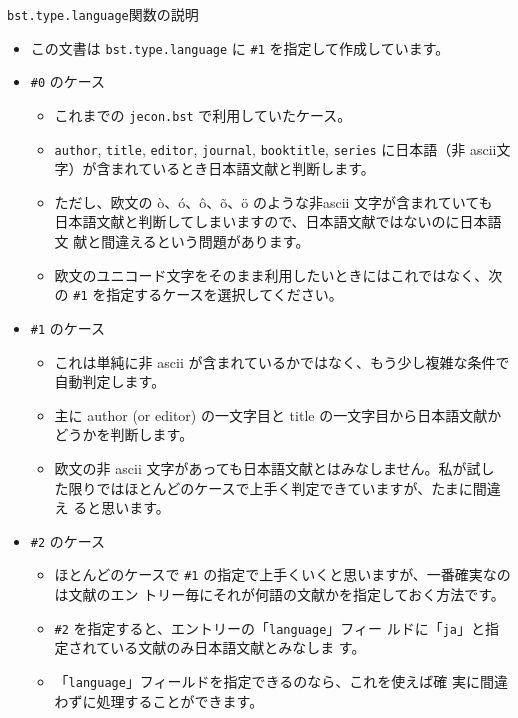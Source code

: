\documentclass[10pt]{bxjsarticle}
\begin{document}
\texttt{bst.type.language}関数の説明
\begin{itemize}
 \item この文書は \texttt{bst.type.language} に \texttt{\#1} を指定して作成しています。
 \item \texttt{\#0} のケース
       \begin{itemize}
	\item これまでの \texttt{jecon.bst} で利用していたケース。
	\item \texttt{author}, \texttt{title}, \texttt{editor},
	      \texttt{journal}, \texttt{booktitle}, \texttt{series} に日本語（非
	      ascii文字）が含まれているとき日本語文献と判断します。
	\item ただし、欧文の ò、ó、ô、õ、ö のような非ascii 文字が含まれていても
	      日本語文献と判断してしまいますので、日本語文献ではないのに日本語文
	      献と間違えるという問題があります。
	\item 欧文のユニコード文字をそのまま利用したいときにはこれではなく、次の
	      \texttt{\#1} を指定するケースを選択してください。
       \end{itemize}
 \item \texttt{\#1} のケース
       \begin{itemize}
	\item これは単純に非 ascii が含まれているかではなく、もう少し複雑な条件で自動判定します。
	\item 主に author (or editor) の一文字目と title の一文字目から日本語文献かどうかを判断します。
	\item 欧文の非 ascii 文字があっても日本語文献とはみなしません。私が試し
	      た限りではほとんどのケースで上手く判定できていますが、たまに間違え
	      ると思います。
       \end{itemize}
 \item \texttt{\#2} のケース
       \begin{itemize}
	\item ほとんどのケースで \texttt{\#1} の指定で上手くいくと思いますが、一番確実なのは文献のエン
	      トリー毎にそれが何語の文献かを指定しておく方法です。
	\item \texttt{\#2} を指定すると、エントリーの「\texttt{language}」フィー
	      ルドに「\texttt{ja}」と指定されている文献のみ日本語文献とみなしま
	      す。
	\item 「\texttt{language}」フィールドを指定できるのなら、これを使えば確
	      実に間違わずに処理することができます。
       \end{itemize}
\end{itemize}
\end{document}
